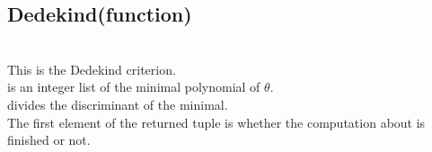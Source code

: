    \subsection{Dedekind(function)}
   \\
   \spacing
   \quad This is the Dedekind criterion.\\
   \spacing \quad {} is an integer list of the
   minimal polynomial of \(\theta\).\\
   \quad {} divides the discriminant of the minimal.\\
   \quad The first element of the returned tuple is whether the
   computation about  is finished or not.\\
  \C



